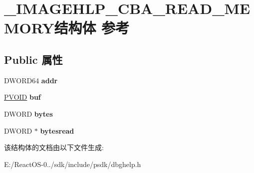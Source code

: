 \hypertarget{struct___i_m_a_g_e_h_l_p___c_b_a___r_e_a_d___m_e_m_o_r_y}{}\section{\+\_\+\+I\+M\+A\+G\+E\+H\+L\+P\+\_\+\+C\+B\+A\+\_\+\+R\+E\+A\+D\+\_\+\+M\+E\+M\+O\+R\+Y结构体 参考}
\label{struct___i_m_a_g_e_h_l_p___c_b_a___r_e_a_d___m_e_m_o_r_y}
\subsection*{Public 属性}
\begin{DoxyCompactItemize}
\item 
\mbox{\label{struct___i_m_a_g_e_h_l_p___c_b_a___r_e_a_d___m_e_m_o_r_y_a2d073e19ecbe04edac149c147ee09a4a}} 
D\+W\+O\+R\+D64 {\bfseries addr}
\item 
\mbox{\label{struct___i_m_a_g_e_h_l_p___c_b_a___r_e_a_d___m_e_m_o_r_y_ad3271d7c02a225529c19c0b536380719}} 
\hyperlink{interfacevoid}{P\+V\+O\+ID} {\bfseries buf}
\item 
\mbox{\label{struct___i_m_a_g_e_h_l_p___c_b_a___r_e_a_d___m_e_m_o_r_y_a16b3970249b502ac657067f7fc805f4e}} 
D\+W\+O\+RD {\bfseries bytes}
\item 
\mbox{\label{struct___i_m_a_g_e_h_l_p___c_b_a___r_e_a_d___m_e_m_o_r_y_af663f87eb930e6f1145a8ed387e6b3b9}} 
D\+W\+O\+RD $\ast$ {\bfseries bytesread}
\end{DoxyCompactItemize}


该结构体的文档由以下文件生成\+:\begin{DoxyCompactItemize}
\item 
E\+:/\+React\+O\+S-\/0../sdk/include/psdk/dbghelp.\+h\end{DoxyCompactItemize}
